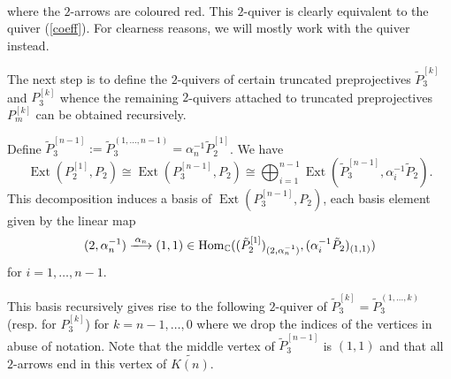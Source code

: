 \documentclass{amsart}
\numberwithin{equation}{section}
\newcommand{\CC}{\mathbb{C}}
\newcommand{\Ext}{\operatorname{Ext}}
\newcommand{\Hom}{\operatorname{Hom}}
\begin{document}
\\

\noindent
where the $2$-arrows are coloured red. This $2$-quiver is clearly equivalent to the quiver (\ref{coeff}). For clearness reasons, we will mostly work with the quiver instead.

The next step is to define the $2$-quivers of certain truncated preprojectives $\tilde P^{[k]}_3$ and $P^{[k]}_3$ whence the remaining $2$-quivers attached to truncated preprojectives $P_m^{[k]}$ can be obtained recursively. 

Define $\tilde P_3^{[n-1]}:=\tilde P_3^{(1,\ldots,n-1)}=\alpha_n^{-1}\tilde P_2^{[1]}$. We have 
$$\Ext(P_2^{[1]},P_2)\cong\Ext(P_3^{[n-1]},P_2)\cong\bigoplus_{i=1}^{n-1}\Ext(\tilde P_3^{[n-1]},\alpha_i^{-1}\tilde P_2).$$
This decomposition induces a basis of $\Ext(P_3^{[n-1]},P_2)$, each basis element given by the linear map $$(2,\alpha_n^{-1})\xlongrightarrow{\alpha_n}(1,1)\in\Hom_{\CC}((\tilde P_2^{[1]})_{(2,\alpha_n^{-1})},(\alpha_i^{-1}\tilde P_2)_{(1,1)})$$
for $i=1,\ldots,n-1$. 

 This basis recursively gives rise to the following $2$-quiver of $\tilde P_3^{[k]}=\tilde P_3^{(1,\ldots,k)}$ (resp. for $P_3^{[k]}$) for $k=n-1,\ldots,0$ where we drop the indices of the vertices in abuse of notation. Note that the middle vertex of $\tilde P_3^{[n-1]}$ is $(1,1)$ and that all $2$-arrows end in this vertex of $\widetilde{K(n)}$.\\
\end{document}
